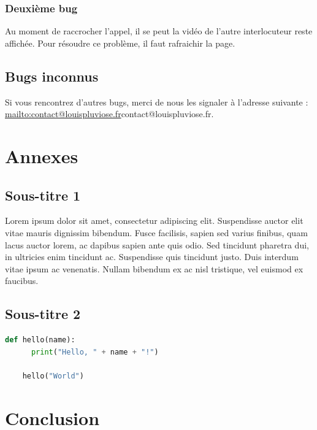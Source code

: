 \documentclass[12pt, a4paper, oneside]{Thesis}
\begin{document}
\subsubsection{Deuxième bug}

Au moment de raccrocher l'appel, il se peut la vidéo de l'autre interlocuteur reste affichée. Pour résoudre ce problème, il faut rafraichir la page.\\

\subsection{Bugs inconnus}

Si vous rencontrez d'autres bugs, merci de nous les signaler à l'adresse suivante : \url{mailto:contact@louispluviose.fr}{contact@louispluviose.fr}.

\newpage

\section{Annexes}

\subsection{Sous-titre 1}


Lorem ipsum dolor sit amet, consectetur adipiscing elit. Suspendisse auctor elit vitae mauris dignissim bibendum. Fusce facilisis, sapien sed varius finibus, quam lacus auctor lorem, ac dapibus sapien ante quis odio. Sed tincidunt pharetra dui, in ultricies enim tincidunt ac. Suspendisse quis tincidunt justo. Duis interdum vitae ipsum ac venenatis. Nullam bibendum ex ac nisl tristique, vel euismod ex faucibus.\\

\subsection{Sous-titre 2}

\begin{lstlisting}[language=Python, caption={Exemple de code Python}, label=mon-code-python]
	def hello(name):
	  print("Hello, " + name + "!")
	
	hello("World")
\end{lstlisting}

\newpage

\section{Conclusion}
\end{document}
